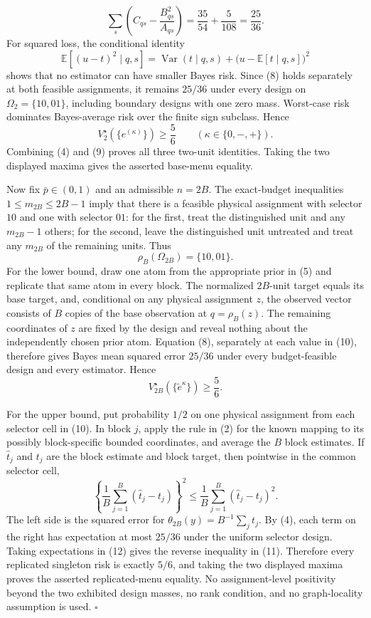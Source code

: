 \[
 \sum_s\left(C_{qs}-\frac{B_{qs}^2}{A_{qs}}\right)
 =\frac{35}{54}+\frac{5}{108}
 =\frac{25}{36}. \tag{8}
\]
For squared loss, the conditional identity
\[
 \mathbb E[(u-t)^2\mid q,s]
 =\operatorname{Var}(t\mid q,s)
  +\bigl(u-\mathbb E[t\mid q,s]\bigr)^2
\]
shows that no estimator can have smaller Bayes risk.  Since (8) holds separately at both feasible assignments, it remains \(25/36\) under every design on \(\Omega_2=\{10,01\}\), including boundary designs with one zero mass.  Worst-case risk dominates Bayes-average risk over the finite sign subclass.  Hence
\[
 V_2^\star(\{e^{(\kappa)}\})\ge\frac56
 \qquad(\kappa\in\{0,-,+\}). \tag{9}
\]
Combining (4) and (9) proves all three two-unit identities.  Taking the two displayed maxima gives the asserted base-menu equality.

Now fix \(\bar p\in(0,1)\) and an admissible \(n=2B\).  The exact-budget inequalities \(1\le m_{2B}\le2B-1\) imply that there is a feasible physical assignment with selector \(10\) and one with selector \(01\): for the first, treat the distinguished unit and any \(m_{2B}-1\) others; for the second, leave the distinguished unit untreated and treat any \(m_{2B}\) of the remaining units.  Thus
\[
 \rho_B(\Omega_{2B})=\{10,01\}. \tag{10}
\]
For the lower bound, draw one atom from the appropriate prior in (5) and replicate that same atom in every block.  The normalized \(2B\)-unit target equals its base target, and, conditional on any physical assignment \(z\), the observed vector consists of \(B\) copies of the base observation at \(q=\rho_B(z)\).  The remaining coordinates of \(z\) are fixed by the design and reveal nothing about the independently chosen prior atom.  Equation (8), separately at each value in (10), therefore gives Bayes mean squared error \(25/36\) under every budget-feasible design and every estimator.  Hence
\[
 V_{2B}^\star(\{\widetilde e^\kappa\})\ge\frac56. \tag{11}
\]

For the upper bound, put probability \(1/2\) on one physical assignment from each selector cell in (10).  In block \(j\), apply the rule in (2) for the known mapping to its possibly block-specific bounded coordinates, and average the \(B\) block estimates.  If \(\widehat t_j\) and \(t_j\) are the block estimate and block target, then pointwise in the common selector cell,
\[
 \left\{\frac1B\sum_{j=1}^B(\widehat t_j-t_j)\right\}^2
 \le\frac1B\sum_{j=1}^B(\widehat t_j-t_j)^2. \tag{12}
\]
The left side is the squared error for \(\theta_{2B}(y)=B^{-1}\sum_jt_j\).  By (4), each term on the right has expectation at most \(25/36\) under the uniform selector design.  Taking expectations in (12) gives the reverse inequality in (11).  Therefore every replicated singleton risk is exactly \(5/6\), and taking the two displayed maxima proves the asserted replicated-menu equality.  No assignment-level positivity beyond the two exhibited design masses, no rank condition, and no graph-locality assumption is used. \(\square\)